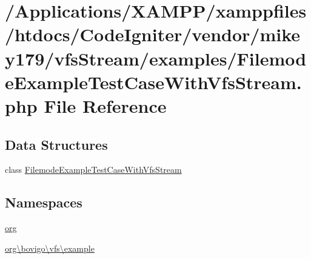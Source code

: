 \hypertarget{_filemode_example_test_case_with_vfs_stream_8php}{}\section{/\+Applications/\+X\+A\+M\+P\+P/xamppfiles/htdocs/\+Code\+Igniter/vendor/mikey179/vfs\+Stream/examples/\+Filemode\+Example\+Test\+Case\+With\+Vfs\+Stream.php File Reference}
\label{_filemode_example_test_case_with_vfs_stream_8php}
\subsection*{Data Structures}
\begin{DoxyCompactItemize}
\item 
class \mbox{\hyperlink{classorg_1_1bovigo_1_1vfs_1_1example_1_1_filemode_example_test_case_with_vfs_stream}{Filemode\+Example\+Test\+Case\+With\+Vfs\+Stream}}
\end{DoxyCompactItemize}
\subsection*{Namespaces}
\begin{DoxyCompactItemize}
\item 
 \mbox{\hyperlink{namespaceorg}{org}}
\item 
 \mbox{\hyperlink{namespaceorg_1_1bovigo_1_1vfs_1_1example}{org\textbackslash{}bovigo\textbackslash{}vfs\textbackslash{}example}}
\end{DoxyCompactItemize}
